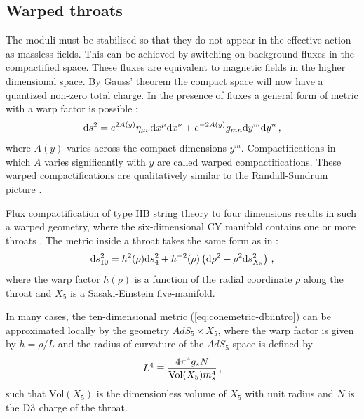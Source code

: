 \subsection{Warped throats}
\label{sec:warpedthroats-dbiintro}
The moduli must
be stabilised so that they do not appear in the effective action as
massless fields. This can be achieved by switching on background fluxes in the
compactified space. These fluxes are equivalent to magnetic
fields in the higher dimensional space. By Gauss' theorem  the compact space
will now have a quantized non-zero total charge.
In the presence of fluxes a general form of metric with a warp factor is
possible \cite{Baumann:2009ni}:
\begin{equation}
\label{eq:warpedmetric-dbiintro}
 \mathrm{d} s^2 = e^{2A(y)}\eta_{\mu\nu} \mathrm{d} x^\mu \mathrm{d} x^\nu + e^{-2A(y)} g_{mn}\mathrm{d} y^m
\mathrm{d} y^n\,,
\end{equation}
where $A(y)$ varies across the compact dimensions $y^m$.
Compactifications in which $A$ varies significantly with $y$ are called warped
compactifications. These warped compactifications are qualitatively similar to
the Randall-Sundrum picture \cite{Randall1999,Brummer2006}.


Flux compactification of type IIB string theory to four dimensions 
results in such a warped geometry, where the six-dimensional CY  
manifold contains one or more throats \cite{douglas,gkp,grana}. 
The metric inside a throat takes the same form as in
:
% 
\begin{equation}
\label{eq:conemetric-dbiintro}
\mathrm{d} s_{10}^2= h^2 ( \rho) \mathrm{d} s_4^2 + h^{-2} (\rho ) 
\left( \mathrm{d}\rho^2 +\rho^2 \mathrm{d} s_{X_5}^2 \right) \,,
\end{equation}
%  
where the warp factor $h (\rho)$ is a function of the 
radial coordinate $\rho$ along the throat and $X_5$
is a Sasaki-Einstein five-manifold. 


In many cases, the ten-dimensional metric (\ref{eq:conemetric-dbiintro}) can be 
approximated locally by the geometry $AdS_5 \times X_5$, where the 
warp factor is given by $h=\rho /L$ and 
the radius of curvature of the $AdS_5$ space is defined by
%  
\begin{equation}
L^4 \equiv \frac{4\pi^4 g_s N}{{\rm Vol} (X_5) m_s^4} \,,
\end{equation}
% 
such that $\mathrm{Vol}(X_5)$ is the dimensionless volume of 
$X_5$ with unit radius and $N$ is the ${\rm D3}$  charge of the throat.


